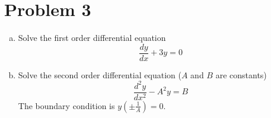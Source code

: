 \section*{Problem 3}

\begin{enumerate}[a)]
\item Solve the first order differential equation
$$ \frac{dy}{dx} + 3y = 0 $$
\item Solve the second order differential equation ($A$ and $B$ are constants)
$$ \frac{d^2 y}{dx^2} - A^2y = B $$
The boundary condition is $y(\pm\frac{1}{A}) = 0$.
\end{enumerate}

